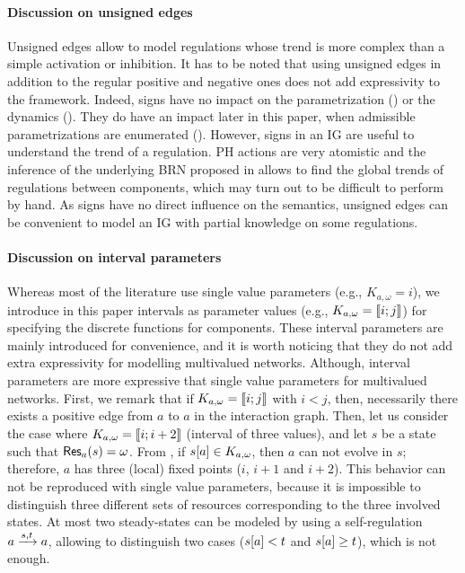 \paragraph{Discussion on unsigned edges}
Unsigned edges allow to model regulations whose trend is more complex than a simple activation or inhibition.
It has to be noted that using unsigned edges in addition to the regular positive and negative ones does not add expressivity to the framework.
Indeed, signs have no impact on the parametrization () or the dynamics ().
They do have an impact later in this paper, when admissible parametrizations are enumerated ().
However, signs in an IG are useful to understand the trend of a regulation.
PH actions are very atomistic and the inference of the underlying BRN proposed in 
allows to find the global trends of regulations between components,
which may turn out to be difficult to perform by hand.
As signs have no direct influence on the semantics, unsigned edges can be convenient to model an IG with partial knowledge on some regulations.

\paragraph{Discussion on interval parameters}
Whereas most of the literature use single value parameters (e.g., $K_{a,\omega} = i$), we introduce
in this paper intervals as parameter values (e.g., $K_{a,\omega} = \llbracket i ; j \rrbracket$) for specifying
the discrete functions for components.
These interval parameters are mainly introduced for convenience, and it is worth noticing that they
do not add extra expressivity for modelling multivalued networks.
Although, interval parameters are more expressive that single value parameters for multivalued networks.
First, we remark that if  $K_{a,\omega} = \llbracket i ; j \rrbracket$ with $i < j$, then, necessarily there exists
a positive edge from $a$ to $a$ in the interaction graph.
Then, let us consider the case where $K_{a,\omega} = \llbracket i ; i+2 \rrbracket$ (interval of three values), and
let $s$ be a state such that $\mathsf{Res}_{a}(s) = \omega$.
From , if ${s[a]} \in K_{a,\omega}$, then $a$ can not evolve in $s$;
therefore, $a$ has three (local) fixed points ($i$, $i+1$ and $i+2$).
This behavior can not be reproduced with single value parameters, because it is impossible to distinguish three different sets of resources corresponding to the three involved states.
At most two steady-states can be modeled by using a self-regulation $a \xrightarrow{s, t} a$, allowing to distinguish two cases (${s[a]} < t$ and ${s[a]} \geq t$), which is not enough.

